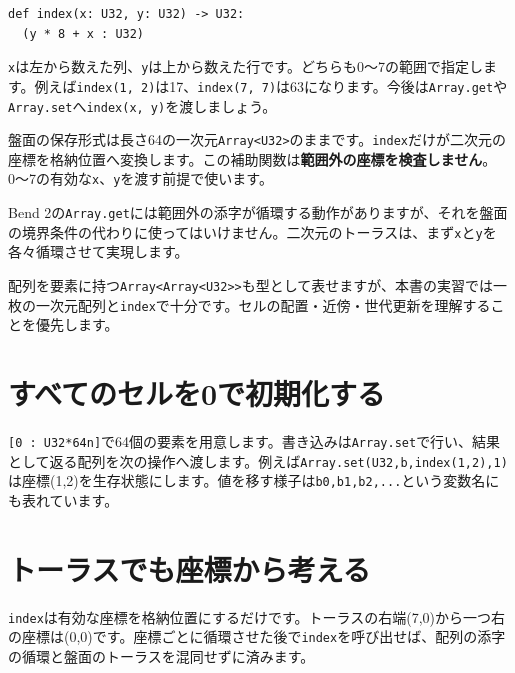 \documentclass[11pt,a4paper,openany]{book}
\newcommand{\code}[1]{\texttt{#1}}
\begin{document}
\begin{lstlisting}[caption={8×8盤面で共通に使う補助関数}]
def index(x: U32, y: U32) -> U32:
  (y * 8 + x : U32)
\end{lstlisting}

\code{x}は左から数えた列、\code{y}は上から数えた行です。どちらも0〜7の範囲で指定します。例えば\code{index(1, 2)}は17、\code{index(7, 7)}は63になります。今後は\code{Array.get}や\code{Array.set}へ\code{index(x, y)}を渡しましょう。

\begin{pointbox}
盤面の保存形式は長さ64の一次元\code{Array<U32>}のままです。\code{index}だけが二次元の座標を格納位置へ変換します。この補助関数は\textbf{範囲外の座標を検査しません}。0〜7の有効な\code{x}、\code{y}を渡す前提で使います。

Bend 2の\code{Array.get}には範囲外の添字が循環する動作がありますが、それを盤面の境界条件の代わりに使ってはいけません。二次元のトーラスは、まず\code{x}と\code{y}を各々循環させて実現します。
\end{pointbox}

配列を要素に持つ\code{Array<Array<U32>>}も型として表せますが、本書の実習では一枚の一次元配列と\code{index}で十分です。セルの配置・近傍・世代更新を理解することを優先します。

\section{すべてのセルを0で初期化する}
\code{[0 : U32*64n]}で64個の要素を用意します。書き込みは\code{Array.set}で行い、結果として返る配列を次の操作へ渡します。例えば\code{Array.set(U32,b,index(1,2),1)}は座標(1,2)を生存状態にします。値を移す様子は\code{b0,b1,b2,...}という変数名にも表れています。

\begin{center}
\end{center}
\section{トーラスでも座標から考える}
\code{index}は有効な座標を格納位置にするだけです。トーラスの右端(7,0)から一つ右の座標は(0,0)です。座標ごとに循環させた後で\code{index}を呼び出せば、配列の添字の循環と盤面のトーラスを混同せずに済みます。
\end{document}
